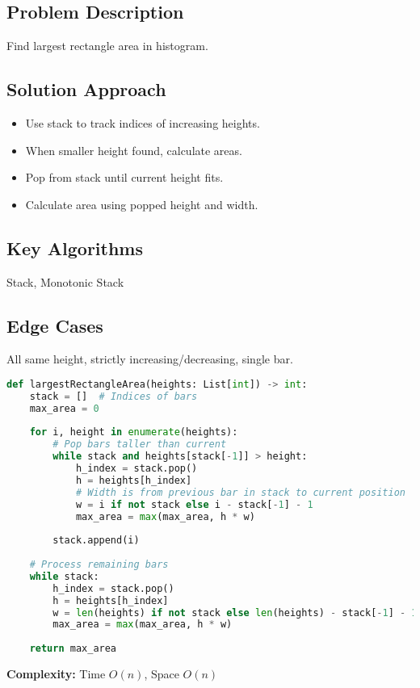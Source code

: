 \documentclass[10pt, a4paper]{article}
\begin{document}
\subsection*{Problem Description}
Find largest rectangle area in histogram.

\subsection*{Solution Approach}
\begin{itemize}
    \item Use stack to track indices of increasing heights.
    \item When smaller height found, calculate areas.
    \item Pop from stack until current height fits.
    \item Calculate area using popped height and width.
\end{itemize}

\subsection*{Key Algorithms}
Stack, Monotonic Stack

\subsection*{Edge Cases}
All same height, strictly increasing/decreasing, single bar.

\begin{lstlisting}[language=Python]
def largestRectangleArea(heights: List[int]) -> int:
    stack = []  # Indices of bars
    max_area = 0
    
    for i, height in enumerate(heights):
        # Pop bars taller than current
        while stack and heights[stack[-1]] > height:
            h_index = stack.pop()
            h = heights[h_index]
            # Width is from previous bar in stack to current position
            w = i if not stack else i - stack[-1] - 1
            max_area = max(max_area, h * w)
        
        stack.append(i)
    
    # Process remaining bars
    while stack:
        h_index = stack.pop()
        h = heights[h_index]
        w = len(heights) if not stack else len(heights) - stack[-1] - 1
        max_area = max(max_area, h * w)
    
    return max_area
\end{lstlisting}
\textbf{Complexity:} Time $O(n)$, Space $O(n)$
\end{document}

